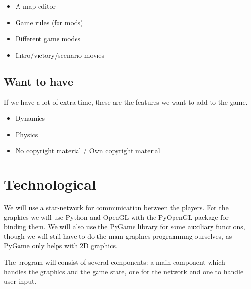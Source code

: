 \documentclass[a4paper,twoside,11pt]{report}
\begin{document}
\begin{itemize}
  \item A map editor
  \item Game rules (for mods)
  \item Different game modes
  \item Intro/victory/scenario movies
\end{itemize}

\section{Want to have} %
\label{sec:want_to_have}
If we have a lot of extra time, these are the features we want to add to the game.

\begin{itemize}
  \item Dynamics
  \item Physics
  \item No copyright material / Own copyright material
\end{itemize}

\chapter{Technological}

We will use a star-network for communication between the players. For the graphics we will use Python and OpenGL with the PyOpenGL package for binding them. We will also use the PyGame library for some auxiliary functions, though we will still have to do the main graphics programming ourselves, as PyGame only helps with 2D graphics.

The program will consist of several components: a main component which handles the graphics and the game state, one for the network and one to handle user input.
\end{document}
